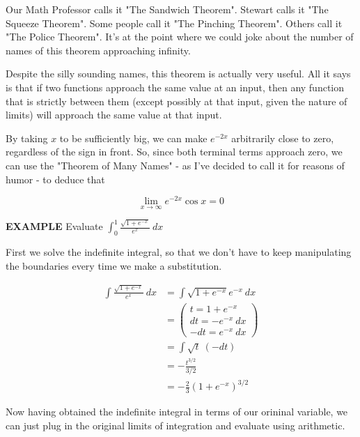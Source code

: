 \documentclass{article}
\begin{document}
\vspace{10pt}

Our Math Professor calls it "The Sandwich Theorem". Stewart calls it "The Squeeze Theorem". Some people call it "The Pinching Theorem". Others call it "The Police Theorem". It's at the point where we could joke about the number of names of this theorem approaching infinity.

\vspace{10pt}

Despite the silly sounding names, this theorem is actually very useful. All it says is that if two functions approach the same value at an input, then any function that is strictly between them (except possibly at that input, given the nature of limits) will approach the same value at that input.

\vspace{10pt}

By taking $x$ to be sufficiently big, we can make $e^{-2x}$ arbitrarily close to zero, regardless of the sign in front. So, since both terminal terms approach zero, we can use the "Theorem of Many Names" - as I've decided to call it for reasons of humor - to deduce that

\[\lim_{x\to\infty}e^{-2x}\cos x=0\]

\vspace{10pt}

{\bf{}EXAMPLE} Evaluate $\displaystyle\int_0^1\frac{\sqrt{1+e^{-x}}}{e^x}\ dx$

\vspace{10pt}

First we solve the indefinite integral, so that we don't have to keep manipulating the boundaries every time we make a substitution.

\begin{align*}
\int\frac{\sqrt{1+e^{-x}}}{e^x}\ dx&=\int\sqrt{1+e^{-x}}e^{-x}\ dx\\
&=\left(\begin{array}{cc}t=1+e^{-x}\\dt=-e^{-x}\ dx\\-dt=e^{-x}\ dx\end{array}\right)\\
&=\int\sqrt{t}\ (-dt)\\
&=-\frac{t^{3/2}}{3/2}\\
&=-\frac{2}{3}(1+e^{-x})^{3/2}
\end{align*}

Now having obtained the indefinite integral in terms of our orininal variable, we can just plug in the original limits of integration and evaluate using arithmetic.
\end{document}
